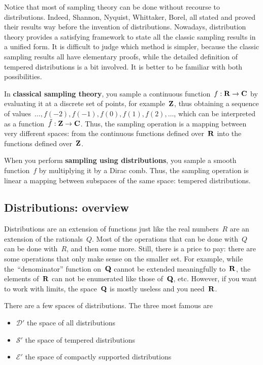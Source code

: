 Notice that most of sampling theory can be done without recourse to
distributions.  Indeed, Shannon, Nyquist, Whittaker, Borel, all
stated and proved their results way before the invention of
distributions.  Nowadays, distribution theory provides a satisfying
framework to state all the classic sampling results in a unified
form.  It is difficult to judge which method is simpler, because the
classic sampling results all have elementary proofs, while the
detailed definition of tempered distributions is a bit involved.
It is better to be familiar with both possibilities.

In {\bf classical sampling theory}, you sample a continuous
function~$f:\mathbf{R}\to\mathbf{C}$ by evaluating it at a discrete set of points,
for example~$\mathbf{Z}$, thus obtaining a sequence of
values~$\ldots,f(-2),f(-1),f(0),f(1),f(2),\ldots$, which can be
interpreted as a function~$\tilde f:\mathbf{Z}\to\mathbf{C}$.  Thus, the sampling
operation is a mapping between very different spaces: from the
continuous functions defined over~$\mathbf{R}$ into the functions defined
over~$\mathbf{Z}$.

When you perform {\bf sampling using distributions}, you sample a
smooth function~$f$ by multiplying it by a Dirac comb.  Thus,
the sampling operation is linear a mapping between subspaces of the same
space: tempered distributions.

\subsection{Distributions: overview}

Distributions are an extension of functions just like the real
numbers~$R$ are an extension of the rationals~$Q$.  Most of the
operations that can be done with~$Q$ can be done with~$R$, and then
some more.  Still, there is a price to pay: there are some
operations that only make sense on the smaller set.  For example,
while the~``denominator'' function on~$\mathbf{Q}$ cannot be extended
meaningfully to~$\mathbf{R}$, the elements of~$\mathbf{R}$ can not be enumerated like
those of~$\mathbf{Q}$, etc.  However, if you want to work with limits, the
space~$\mathbf{Q}$ is mostly useless and you need~$\mathbf{R}$.

There are a few spaces of distributions.  The three most famous are
\begin{itemize}
	\item $\mathcal{D}'$ the space of all distributions
	\item $\mathcal{S}'$ the space of tempered distributions
	\item $\mathcal{E}'$ the space of compactly supported distributions
\end{itemize}

